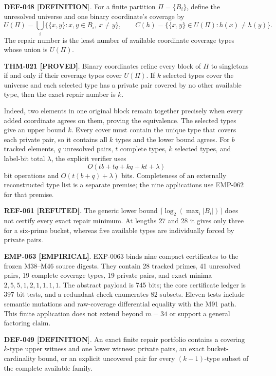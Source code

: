 \documentclass[11pt]{article}
\newcommand{\claimstatus}[2]{\textbf{#1 [#2]}}
\begin{document}
\claimstatus{DEF-048}{DEFINITION}. For a finite partition
\(\Pi=\{B_i\}\), define the unresolved universe and one binary coordinate's
coverage by
\[
 U(\Pi)=\bigcup_i\{\{x,y\}:x,y\in B_i,\ x\ne y\},\qquad
 C(h)=\{\{x,y\}\in U(\Pi):h(x)\ne h(y)\}.
\]
The repair number is the least number of available coordinate coverage types
whose union is \(U(\Pi)\).

\claimstatus{THM-021}{PROVED}. Binary coordinates refine every block of
\(\Pi\) to singletons if and only if their coverage types cover
\(U(\Pi)\). If \(k\) selected types cover the universe and each selected type
has a private pair covered by no other available type, then the exact repair
number is \(k\).

Indeed, two elements in one original block remain together precisely when
every added coordinate agrees on them, proving the equivalence. The selected
types give an upper bound \(k\). Every cover must contain the unique type
that covers each private pair, so it contains all \(k\) types and the lower
bound agrees. For \(b\) tracked elements, \(q\) unresolved pairs, \(t\)
complete types, \(k\) selected types, and label-bit total \(\lambda\), the
explicit verifier uses
\[
 O(tb+tq+kq+kt+\lambda)
\]
bit operations and \(O(t(b+q)+\lambda)\) bits. Completeness of an externally
reconstructed type list is a separate premise; the nine applications use
EMP-062 for that premise.

\claimstatus{REF-061}{REFUTED}. The generic lower bound
\(\lceil\log_2(\max_i|B_i|)\rceil\) does not certify every exact repair
minimum. At lengths 27 and 28 it gives only three for a six-prime bucket,
whereas five available types are individually forced by private pairs.

\claimstatus{EMP-063}{EMPIRICAL}. EXP-0063 binds nine compact certificates
to the frozen M38--M46 source digests. They contain 28 tracked primes, 41
unresolved pairs, 19 complete coverage types, 19 private pairs, and exact
minima \(2,5,5,1,2,1,1,1,1\). The abstract payload is 745 bits; the core
certificate ledger is 397 bit tests, and a redundant check enumerates 82
subsets. Eleven tests include semantic mutations and raw-coverage
differential equality with the M91 path. This finite application does not
extend beyond \(m=34\) or support a general factoring claim.

\claimstatus{DEF-049}{DEFINITION}. An exact finite repair portfolio contains
a covering \(k\)-type upper witness and one lower witness: private pairs, an
exact bucket-cardinality bound, or an explicit uncovered pair for every
\((k-1)\)-type subset of the complete available family.
\end{document}
